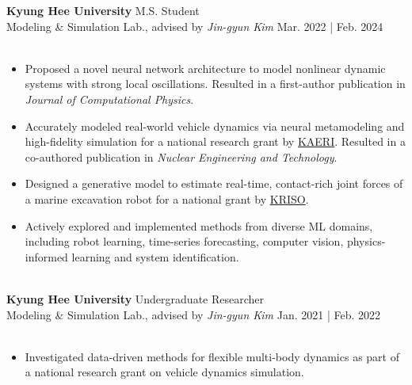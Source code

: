 \documentclass[a4paper,10pt]{extarticle}
\begin{document}
\noindent\textbf{Kyung Hee University} \hfill M.S. Student\\
Modeling \& Simulation Lab., advised by \textsl{Jin-gyun Kim} \hfill Mar. 2022 | Feb. 2024\\
\vspace*{-0.25cm}\\
\begin{minipage}{0.77\textwidth}
	\small
	\begin{itemize}
		\item Proposed a novel neural network architecture to model nonlinear dynamic systems with strong local oscillations. Resulted in a first-author publication in \textit{Journal of Computational Physics}.
		\item Accurately modeled real-world vehicle dynamics via neural metamodeling and high-fidelity simulation for a national research grant by \href{https://www.kaeri.re.kr/eng/}{KAERI}. Resulted in a co-authored publication in \textit{Nuclear Engineering and Technology}.
		\item Designed a generative model to estimate real-time, contact-rich joint forces of a marine excavation robot for a national grant by \href{https://www.kriso.re.kr/eng/}{KRISO}.
		\item Actively explored and implemented methods from diverse ML domains, including robot learning, time-series forecasting, computer vision, physics-informed learning and system identification.
	\end{itemize}
\end{minipage}\\

\vspace*{0.1cm}
\noindent\textbf{Kyung Hee University} \hfill Undergraduate Researcher\\
Modeling \& Simulation Lab., advised by \textsl{Jin-gyun Kim} \hfill Jan. 2021 | Feb. 2022\\
\vspace*{-0.25cm}\\
\begin{minipage}{0.77\textwidth}
	\small
	\begin{itemize}
		\item Investigated data-driven methods for flexible multi-body dynamics as part of a national research grant on vehicle dynamics simulation.
	\end{itemize}
\end{minipage}\\
\vspace*{-0.2cm}
\end{document}
